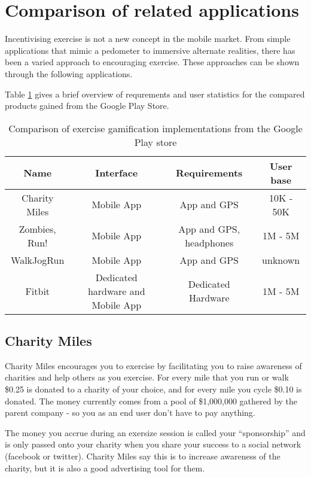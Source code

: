 \section{Comparison of related applications}\label{sec_comparison}
Incentivising exercise is not a new concept in the mobile market. From
simple applications that mimic a pedometer to immersive alternate
realities, there has been a varied approach to encouraging
exercise. These approaches can be shown through the following
applications. 

Table \ref{table:competitor_comparison} gives a brief
overview of requrements and user statistics for the compared products
gained from the Google Play Store.

\begin{table}[h]
  \centering
  \begin{tabular}{ | c | c | c | c |} \hline
    Name & Interface & Requirements & User base  \\ \hline
    Charity Miles & Mobile App & App and GPS & 10K - 50K\\ \hline
    Zombies, Run! & Mobile App & App and GPS, headphones & 1M - 5M\\ \hline
    WalkJogRun & Mobile App & App and GPS  & unknown \\ \hline
    Fitbit & Dedicated hardware and Mobile App & Dedicated Hardware & 1M - 5M\\ \hline
  \end{tabular}
  \caption{Comparison of exercise gamification implementations from
    the Google Play store}
  \label{table:competitor_comparison}
\end{table}

\subsection{Charity Miles}
Charity Miles encourages you to exercise by facilitating you to raise
awareness of charities and help
others as you exercise. For every mile that you run or walk \$0.25 is
donated to a charity of your choice, and for every mile you cycle \$0.10
is donated. The money currently comes from a pool of \$1,000,000
gathered by the parent company - so you as an end user don't have to pay
anything. 

The money you accrue during an exersize session is called your
``sponsorship'' and is only passed onto your charity when you share
your success to a social network (facebook or
twitter)\cite{charitymiles_terms}. Charity Miles say this is to
increase awareness of the charity, but it is also a good advertising
tool for them.

